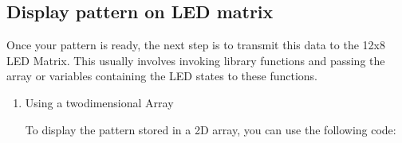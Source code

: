 \documentclass[a4paper,11pt,english]{sphinxmanual}
\begin{document}
\subsection{Display pattern on LED matrix}
\label{\detokenize{Extension_Project/12x8_LED_Matrix:display-pattern-on-led-matrix}}
\sphinxAtStartPar
Once your pattern is ready, the next step is to transmit this data to the 12x8 LED Matrix. This usually involves invoking library functions and passing the array or variables containing the LED states to these functions.
\begin{enumerate}
%
\item {} 
\sphinxAtStartPar
Using a two\sphinxhyphen{}dimensional Array

\sphinxAtStartPar
To display the pattern stored in a 2D array, you can use the following code:

\begin{sphinxVerbatim}[commandchars=\\\{\}]



\end{sphinxVerbatim}
\end{enumerate}
\end{document}

